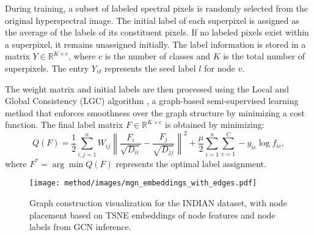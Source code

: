During training, a subset of labeled spectral pixels is randomly selected from the original hyperspectral image. The initial label of each superpixel is assigned as the average of the labels of its constituent pixels. If no labeled pixels exist within a superpixel, it remains unassigned initially. The label information is stored in a matrix \( Y \in \mathbb{R}^{K \times c} \), where \( c \) is the number of classes and \( K \) is the total number of superpixels. The entry \( Y_{vl} \) represents the seed label \( l \) for node \( v \). 

The weight matrix and initial labels are then processed using the Local and Global Consistency (LGC) algorithm \citep{zhou2004lgc}, a graph-based semi-supervised learning method that enforces smoothness over the graph structure by minimizing a cost function. The final label matrix \( F \in \mathbb{R}^{K \times c} \) is obtained by minimizing:  
\begin{equation} \label{equ:lcg_loss}
    Q(F) = \frac{1}{2} \sum_{i,j=1}^n W_{ij} \left\|\frac{F_i}{\sqrt{D_{ii}}} - \frac{F_j}{\sqrt{D_{jj}}}\right\|^2 + \frac{\mu}{2} \sum_{i=1}^n \sum_{c=1}^C -y_{ic} \log f_{ic},
\end{equation}  
where \( F^* = \arg\min Q(F) \) represents the optimal label assignment.

\begin{figure*}[h]
    \centering
    \texttt{[image: method/images/mgn\_embeddings\_with\_edges.pdf]}
    \caption{Graph construction visualization for the INDIAN dataset, with node placement based on TSNE embeddings of node features and node labels from GCN inference.}
    \label{fig:indian_graph}
\end{figure*}

